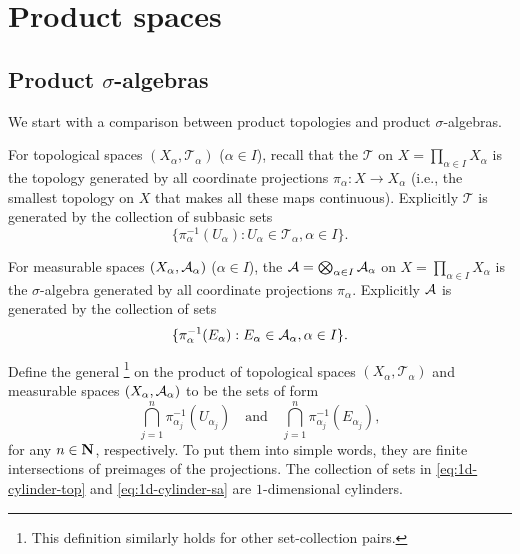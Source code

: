 \chapter{Product spaces}
\section{Product \texorpdfstring{$\sigma$-algebras}{sigma-algebra}} \label{sec:prod-sigma-algebras}

We start with a comparison between product topologies and product $\sigma$-algebras. %

For topological spaces $(X_\alpha,\mathcal{T}_\alpha)$ ($\alpha \in I$), recall that the  $\mathcal{T}$ on $X = \prod_{\alpha \in I} X_\alpha$ is the topology generated by all coordinate projections $\pi_\alpha\colon X \to X_\alpha$ (i.e., the smallest topology on $X$ that makes all these maps continuous). Explicitly $\mathcal T$ is generated by the collection of subbasic sets \begin{equation} \label{eq:1d-cylinder-top}
    \{\pi_\alpha^{-1}(U_\alpha): U_\alpha\in \mathcal{T}_\alpha, \alpha \in I\}.
\end{equation}
    
For measurable spaces $(X_\alpha, \mathcal{A}_\alpha)$ ($\alpha \in I$), the  $\mathcal{A} = \bigotimes_{\alpha\in I} \mathcal{A}_\alpha$ on $X = \prod_{\alpha \in I} X_\alpha$ is the $\sigma$-algebra generated by all coordinate projections $\pi_\alpha$. Explicitly $\mathcal{A}$ is generated by the collection of sets \begin{equation} \label{eq:1d-cylinder-sa}
     \{\pi_\alpha^{-1}(E_\alpha): E_\alpha\in \A_\alpha, \alpha \in I\}.
\end{equation}

Define the general \footnote{This definition similarly holds for other set-collection pairs.} on the product of topological spaces $(X_\alpha,\mathcal{T}_\alpha)$ and measurable spaces $(X_\alpha,\mathcal{A}_\alpha)$ to be the sets of form \[
    \bigcap_{j=1}^n \pi_{\alpha_{j}}^{-1}(U_{\alpha_j}) \quad \text{and} \quad \bigcap_{j=1}^n \pi_{\alpha_{j}}^{-1}(E_{\alpha_j}),
\] for any $n \in \mathbf{N}$, respectively. To put them into simple words, they are finite intersections of preimages of the projections. The collection of sets in \eqref{eq:1d-cylinder-top} and \eqref{eq:1d-cylinder-sa} are $1$-dimensional cylinders.

